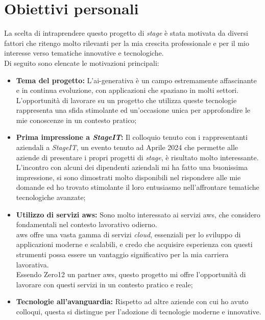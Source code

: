 \section{Obiettivi personali}
\label{sez:obiettivi-personali}

La scelta di intraprendere questo progetto di \textit{stage} è stata motivata da diversi fattori che ritengo molto rilevanti per la mia crescita professionale e per il mio interesse verso tematiche innovative e tecnologiche.\\

\noindent Di seguito sono elencate le motivazioni principali:

\begin{itemize}
    \item \textbf{Tema del progetto:} L'\gls{ai-generativa} è un campo estremamente affascinante e in continua evoluzione, con applicazioni che spaziano in molti settori.\\
    L'opportunità di lavorare su un progetto che utilizza queste tecnologie rappresenta una sfida stimolante ed un'occasione unica per approfondire le mie conoscenze in un contesto pratico;
    \item \textbf{Prima impressione a \textit{StageIT}:} Il colloquio tenuto con i rappresentanti aziendali a \textit{StageIT}, un evento tenuto ad Aprile 2024 che permette alle aziende di presentare i propri progetti di \textit{stage}, è risultato molto interessante. \\
    L'incontro con alcuni dei dipendenti aziendali mi ha fatto una buonissima impressione, si sono dimostrati molto disponibili nel rispondere alle mie domande ed ho trovato stimolante il loro entusiasmo nell'affrontare tematiche tecnologiche avanzate;
    \item \textbf{Utilizzo di servizi \gls{aws}:} Sono molto interessato ai servizi \gls{aws}, che considero fondamentali nel contesto lavorativo odierno. \\
    \gls{aws} offre una vasta gamma di servizi \textit{cloud}, essenziali per lo sviluppo di applicazioni moderne e scalabili, e credo che acquisire esperienza con questi strumenti possa essere un vantaggio significativo per la mia carriera lavorativa.\\
    Essendo Zero12 un partner \gls{aws}, questo progetto mi offre l'opportunità di lavorare con questi servizi in un contesto pratico e reale;
    \item \textbf{Tecnologie all'avanguardia:} Rispetto ad altre aziende con cui ho avuto colloqui, questa si distingue per l'adozione di tecnologie moderne e innovative. \\

\end{itemize}
